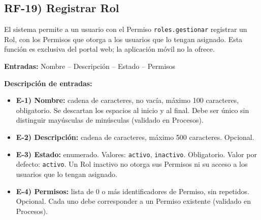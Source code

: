 
\subsection*{RF-19) Registrar Rol}
El sistema permite a un usuario con el Permiso \texttt{roles.gestionar} registrar un Rol, con los Permisos que otorga a los usuarios que lo tengan asignado. Esta funci\'on es exclusiva del portal web; la aplicaci\'on m\'ovil no la ofrece.

\textbf{Entradas:} Nombre -- Descripci\'on -- Estado -- Permisos

\textbf{Descripci\'on de entradas:}
\begin{itemize}[label={}, leftmargin=1.5em]
  \item \textbf{E-1) Nombre:} cadena de caracteres, no vac\'ia, m\'aximo 100 caracteres, obligatorio. Se descartan los espacios al inicio y al final. Debe ser \'unico sin distinguir may\'usculas de min\'usculas (validado en Procesos).
  \item \textbf{E-2) Descripci\'on:} cadena de caracteres, m\'aximo 500 caracteres. Opcional.
  \item \textbf{E-3) Estado:} enumerado. Valores: \texttt{activo}, \texttt{inactivo}. Obligatorio. Valor por defecto: \texttt{activo}. Un Rol inactivo no otorga sus Permisos ni su acceso a los usuarios que lo tengan asignado.
  \item \textbf{E-4) Permisos:} lista de 0 o m\'as identificadores de Permiso, sin repetidos. Opcional. Cada uno debe corresponder a un Permiso existente (validado en Procesos).
\end{itemize}

